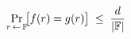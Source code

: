 \documentclass[preview]{standalone}
\begin{document}
\begin{align*}
\special{dvisvgm:raw <g id='unique000'>}\Pr_{r \,\leftarrow\, \mathbb{F}}\!\bigl[f(r) = g(r)\bigr] \;\leq\; \frac{d}{|\mathbb{F}|}\special{dvisvgm:raw </g>}
\end{align*}
\end{document}
